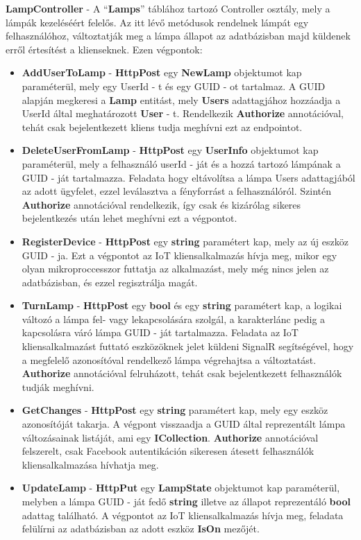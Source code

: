\documentclass[a4paper,12pt]{report}
\begin{document}
    \textbf{LampController} - A ``\textbf{Lamps}'' táblához tartozó Controller osztály, mely a lámpák kezeléséért felelős. Az itt lévő metódusok
    rendelnek lámpát egy felhasználóhoz, változtatják meg a lámpa állapot az adatbázisban majd küldenek erről értesítést a klienseknek. Ezen végpontok:

    \begin{itemize}
        \item \textbf{AddUserToLamp} - \textbf{HttpPost} egy \textbf{NewLamp} objektumot kap paraméterül, mely egy UserId - t és egy GUID - ot tartalmaz.
        A GUID alapján megkeresi a \textbf{Lamp} entitást, mely \textbf{Users} adattagjához hozzáadja a UserId által meghatározott \textbf{User} - t.
        Rendelkezik \textbf{Authorize} annotációval, tehát csak bejelentkezett kliens tudja meghívni ezt az endpointot.
        \item \textbf{DeleteUserFromLamp} - \textbf{HttpPost} egy \textbf{UserInfo} objektumot kap paraméterül, mely a felhasználó userId - ját és
        a hozzá tartozó lámpának a GUID - ját tartalmazza. Feladata hogy eltávolítsa a lámpa Users adattagjából az adott ügyfelet, ezzel leválasztva
        a fényforrást a felhasználóról. Szintén \textbf{Authorize} annotációval rendelkezik, így csak és kizárólag sikeres bejelentkezés után
        lehet meghívni ezt a végpontot.
        \item \textbf{RegisterDevice} - \textbf{HttpPost} egy \textbf{string} paramétert kap, mely az új eszköz GUID - ja. Ezt a végpontot
        az IoT kliensalkalmazás hívja meg, mikor egy olyan mikroproccesszor futtatja az alkalmazást, mely még nincs jelen az adatbázisban,
        és ezzel regisztrálja magát.
        \item \textbf{TurnLamp} - \textbf{HttpPost} egy \textbf{bool} és egy \textbf{string} paramétert kap, a logikai változó a lámpa fel- vagy lekapcsolására
        szolgál, a karakterlánc pedig a kapcsolásra váró lámpa GUID - ját tartalmazza. Feladata az IoT kliensalkalmazást futtató eszközöknek
        jelet küldeni SignalR segítségével, hogy a megfelelő azonosítóval rendelkező lámpa végrehajtsa a változtatást. \textbf{Authorize}
        annotációval felruházott, tehát csak bejelentkezett felhasználók tudják meghívni.
        \item \textbf{GetChanges} - \textbf{HttpPost} egy \textbf{string} paramétert kap, mely egy eszköz azonosítóját takarja. A végpont visszaadja
        a GUID által reprezentált lámpa változásainak listáját, ami egy \textbf{ICollection}. \textbf{Authorize} annotációval felszerelt, csak Facebook
        autentikáción sikeresen átesett felhasználók kliensalkalmazása hívhatja meg.
        \item \textbf{UpdateLamp} - \textbf{HttpPut} egy \textbf{LampState} objektumot kap paraméterül, melyben a lámpa GUID - ját fedő \textbf{string}
        illetve az állapot reprezentáló \textbf{bool} adattag található. A végpontot az IoT kliensalkalmazás hívja meg, feladata felülírni az adatbázisban
        az adott eszköz \textbf{IsOn} mezőjét.
    \end{itemize}
\end{document}
